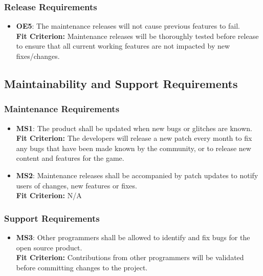 \documentclass[12pt, titlepage]{article}
\begin{document}
\subsubsection{Release Requirements}
\begin{itemize}
    \item \textbf{OE5}: The maintenance releases will not cause previous features to fail.\\
    \textbf{Fit Criterion:} Maintenance releases will be thoroughly tested before release to ensure that all current working features are not impacted by new fixes/changes. 
    
\end{itemize}

\subsection{Maintainability and Support Requirements}

\subsubsection{Maintenance Requirements}
\begin{itemize}
    \item \textbf{MS1}: The product shall be updated when new bugs or glitches are known.\\
    \textbf{Fit Criterion:} The developers will release a new patch every month to fix any bugs that have been made known by the community, or to release new content and features for the game.
    
    \item \textbf{MS2}: Maintenance releases shall be accompanied by patch updates to notify users of changes, new features or fixes.\\
    \textbf{Fit Criterion:} N/A
    
\end{itemize}

\subsubsection{Support Requirements}
\begin{itemize}
    \item \textbf{MS3}: Other programmers shall be allowed to identify and fix bugs for the open source product.\\
    \textbf{Fit Criterion:} Contributions from other programmers will be validated before committing changes to the project.
\end{itemize}
\end{document}
